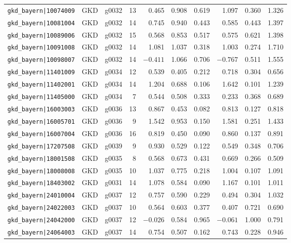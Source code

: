 \begin{table}[p]
{\begin{tabular}{lllrrrrrrr}
\texttt{gkd\_bayern|10074009} & GKD & g0032 & 13 & 0.465 & 0.908 & 0.619 & 1.097 & 0.360 & 1.326 \\
\texttt{gkd\_bayern|10081004} & GKD & g0032 & 14 & 0.745 & 0.940 & 0.443 & 0.585 & 0.443 & 1.397 \\
\texttt{gkd\_bayern|10089006} & GKD & g0032 & 15 & 0.568 & 0.853 & 0.517 & 0.575 & 0.621 & 1.398 \\
\texttt{gkd\_bayern|10091008} & GKD & g0032 & 14 & 1.081 & 1.037 & 0.318 & 1.003 & 0.274 & 1.710 \\
\texttt{gkd\_bayern|10098007} & GKD & g0032 & 14 & $-0.411$ & 1.066 & 0.706 & $-0.767$ & 0.511 & 1.555 \\
\texttt{gkd\_bayern|11401009} & GKD & g0034 & 12 & 0.539 & 0.405 & 0.212 & 0.718 & 0.304 & 0.656 \\
\texttt{gkd\_bayern|11402001} & GKD & g0034 & 14 & 1.204 & 0.688 & 0.106 & 1.642 & 0.101 & 1.239 \\
\texttt{gkd\_bayern|11405000} & GKD & g0034 & 7 & 0.544 & 0.508 & 0.333 & 0.233 & 0.368 & 0.689 \\
\texttt{gkd\_bayern|16003003} & GKD & g0036 & 13 & 0.867 & 0.453 & 0.082 & 0.813 & 0.127 & 0.818 \\
\texttt{gkd\_bayern|16005701} & GKD & g0036 & 9 & 1.542 & 0.953 & 0.150 & 1.581 & 0.251 & 1.433 \\
\texttt{gkd\_bayern|16007004} & GKD & g0036 & 16 & 0.819 & 0.450 & 0.090 & 0.860 & 0.137 & 0.891 \\
\texttt{gkd\_bayern|17207508} & GKD & g0039 & 9 & 0.930 & 0.529 & 0.122 & 0.549 & 0.348 & 0.706 \\
\texttt{gkd\_bayern|18001508} & GKD & g0035 & 8 & 0.568 & 0.673 & 0.431 & 0.669 & 0.266 & 0.509 \\
\texttt{gkd\_bayern|18008008} & GKD & g0035 & 10 & 1.037 & 0.775 & 0.218 & 1.004 & 0.107 & 1.091 \\
\texttt{gkd\_bayern|18403002} & GKD & g0031 & 14 & 1.078 & 0.584 & 0.090 & 1.167 & 0.101 & 1.011 \\
\texttt{gkd\_bayern|24010004} & GKD & g0037 & 12 & 0.757 & 0.590 & 0.229 & 0.494 & 0.304 & 1.032 \\
\texttt{gkd\_bayern|24022003} & GKD & g0037 & 10 & 0.564 & 0.603 & 0.377 & 0.407 & 0.721 & 0.690 \\
\texttt{gkd\_bayern|24042000} & GKD & g0037 & 12 & $-0.026$ & 0.584 & 0.965 & $-0.061$ & 1.000 & 0.791 \\
\texttt{gkd\_bayern|24064003} & GKD & g0037 & 14 & 0.754 & 0.507 & 0.162 & 0.743 & 0.228 & 0.946 \\

\end{tabular}}
\end{table}
